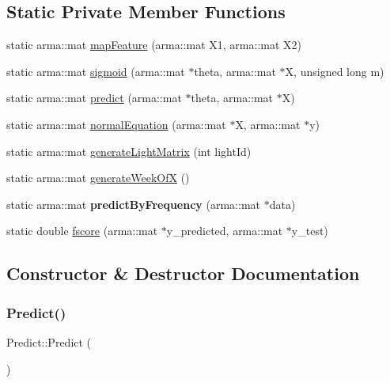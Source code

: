 \subsection*{Static Private Member Functions}
\begin{DoxyCompactItemize}
\item 
static arma\+::mat \hyperlink{class_predict_a8c922a17b4f5b2f17e92cc6c4e5b0e44}{map\+Feature} (arma\+::mat X1, arma\+::mat X2)
\item 
static arma\+::mat \hyperlink{class_predict_ab9e33519596b14f8147259cbe2c180b3}{sigmoid} (arma\+::mat $\ast$theta, arma\+::mat $\ast$X, unsigned long m)
\item 
static arma\+::mat \hyperlink{class_predict_ac446da0fee7e72bb7ae5f0f9bb427eb3}{predict} (arma\+::mat $\ast$theta, arma\+::mat $\ast$X)
\item 
static arma\+::mat \hyperlink{class_predict_a386491f9b107d209007f6930589476f3}{normal\+Equation} (arma\+::mat $\ast$X, arma\+::mat $\ast$y)
\item 
static arma\+::mat \hyperlink{class_predict_a9abe08bc86d298515354df348bfb3296}{generate\+Light\+Matrix} (int light\+Id)
\item 
static arma\+::mat \hyperlink{class_predict_a4841c8dca153dbc59ecaccec41686109}{generate\+Week\+OfX} ()
\item 
\mbox{\label{class_predict_a4967ed58a732e771ed1945338e97ed3f}} 
static arma\+::mat {\bfseries predict\+By\+Frequency} (arma\+::mat $\ast$data)
\item 
static double \hyperlink{class_predict_a5b43a54e1dea7d5198d8f551670fdc65}{fscore} (arma\+::mat $\ast$y\+\_\+predicted, arma\+::mat $\ast$y\+\_\+test)
\end{DoxyCompactItemize}


\subsection{Constructor \& Destructor Documentation}
\mbox{\label{class_predict_af917672f59888068ae9d3f0a211e0672}} 
\subsubsection{\texorpdfstring{Predict()}{Predict()}}
{\footnotesize\ttfamily Predict\+::\+Predict (\begin{DoxyParamCaption}{ }\end{DoxyParamCaption})}



